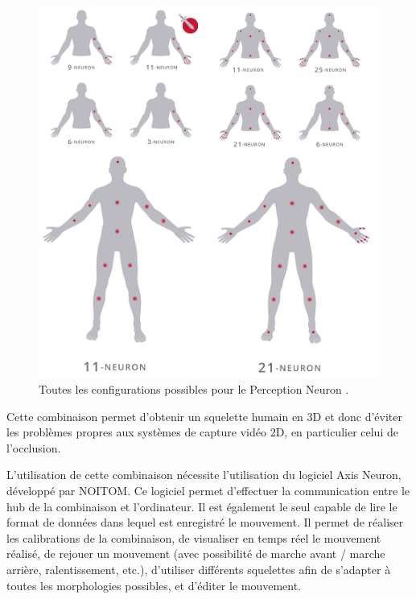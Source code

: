 \begin{figure}
	\centering
    \includegraphics[width=\textwidth]{pictures/perception_neuron_all_combinations.png}
    \caption[Configurations possibles pour le Perception Neuron]{Toutes les configurations possibles pour le Perception Neuron \parencite{Noitom2015Doc}.}
    \label{fig:perception_neuron_all_combinations}
\end{figure}

Cette combinaison permet d'obtenir un squelette humain en 3D et donc d'éviter les problèmes propres aux  systèmes de capture vidéo 2D, en particulier celui de l'occlusion.

L'utilisation de cette combinaison nécessite l'utilisation du logiciel Axis Neuron, développé par NOITOM. Ce logiciel permet d'effectuer la communication entre le hub de la combinaison et l'ordinateur. Il est également le seul capable de lire le format de données dans lequel est enregistré le mouvement. Il permet de réaliser les calibrations de la combinaison, de visualiser en temps réel le mouvement réalisé, de rejouer un mouvement (avec possibilité de marche avant / marche arrière, ralentissement, etc.), d'utiliser différents squelettes afin de s'adapter à toutes les morphologies possibles, et d'éditer le mouvement.

